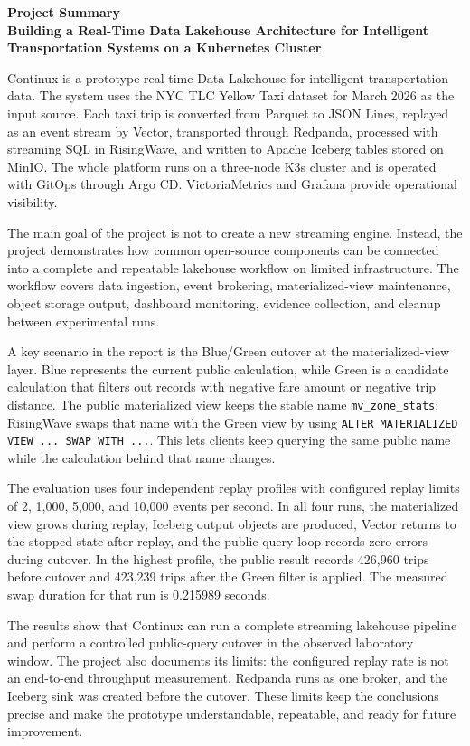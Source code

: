 \documentclass[13pt,a4paper]{extarticle}
\begin{document}
\begin{center}
{\bfseries Project Summary}\\[4pt]
{\bfseries Building a Real-Time Data Lakehouse Architecture for Intelligent Transportation Systems on a Kubernetes Cluster}
\end{center}

Continux is a prototype real-time Data Lakehouse for intelligent transportation data. The system uses the NYC TLC Yellow Taxi dataset for March 2026 as the input source. Each taxi trip is converted from Parquet to JSON Lines, replayed as an event stream by Vector, transported through Redpanda, processed with streaming SQL in RisingWave, and written to Apache Iceberg tables stored on MinIO. The whole platform runs on a three-node K3s cluster and is operated with GitOps through Argo CD. VictoriaMetrics and Grafana provide operational visibility.

The main goal of the project is not to create a new streaming engine. Instead, the project demonstrates how common open-source components can be connected into a complete and repeatable lakehouse workflow on limited infrastructure. The workflow covers data ingestion, event brokering, materialized-view maintenance, object storage output, dashboard monitoring, evidence collection, and cleanup between experimental runs.

A key scenario in the report is the Blue/Green cutover at the materialized-view layer. Blue represents the current public calculation, while Green is a candidate calculation that filters out records with negative fare amount or negative trip distance. The public materialized view keeps the stable name \texttt{mv\_zone\_stats}; RisingWave swaps that name with the Green view by using \texttt{ALTER MATERIALIZED VIEW ... SWAP WITH ...}. This lets clients keep querying the same public name while the calculation behind that name changes.

The evaluation uses four independent replay profiles with configured replay limits of 2, 1,000, 5,000, and 10,000 events per second. In all four runs, the materialized view grows during replay, Iceberg output objects are produced, Vector returns to the stopped state after replay, and the public query loop records zero errors during cutover. In the highest profile, the public result records 426,960 trips before cutover and 423,239 trips after the Green filter is applied. The measured swap duration for that run is 0.215989 seconds.

The results show that Continux can run a complete streaming lakehouse pipeline and perform a controlled public-query cutover in the observed laboratory window. The project also documents its limits: the configured replay rate is not an end-to-end throughput measurement, Redpanda runs as one broker, and the Iceberg sink was created before the cutover. These limits keep the conclusions precise and make the prototype understandable, repeatable, and ready for future improvement.
\end{document}
